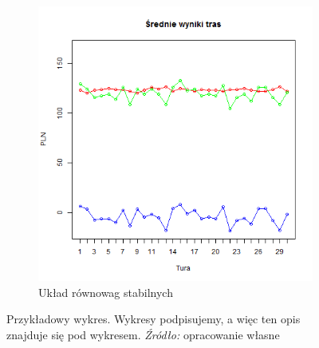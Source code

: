 \documentclass[polish, twoside, 12pt, a4paper]{article}
\theoremstyle{definition}
\theoremstyle{plain}
\theoremstyle{remark}
\begin{document}
\begin{figure}[hbt]
\begin{subfigure}[t]{0.45\textwidth}
    \includegraphics[width=\textwidth]{pictures/brak_algorytmu/trasy.png}
    \caption{Układ równowag stabilnych}
    \label{fig:brak2}
  \end{subfigure}
  
  \captionsetup{margin=10pt,font=small,labelfont=bf,width=.8\textwidth}

  \caption[Krótka nazwa II]{Przykładowy wykres. Wykresy podpisujemy, a więc ten opis znajduje się pod wykresem. \textit{Źródło:} opracowanie własne}\label{fig:xxx}
\end{figure}
\end{document}
